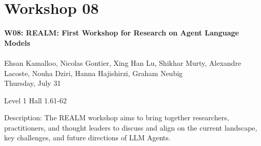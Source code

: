 \clearpage



\section[W08: REALM: First Workshop for Research on Agent Language Models]{Workshop 08}
\label{workshop_8}

\begin{center}
    {\Large \textbf{W08: REALM: First Workshop for Research on Agent Language Models}}\\
\\

    Ehsan Kamalloo, Nicolas Gontier, Xing Han Lu, Shikhar Murty, Alexandre Lacoste, Nouha Dziri, Hanna Hajishirzi, Graham Neubig\\

    Thursday, July 31
    
    Level 1 Hall 1.61-62

\end{center}

Description: The REALM workshop aims to bring together researchers, practitioners, and thought leaders to discuss and align on the current landscape, key challenges, and future directions of LLM Agents.


